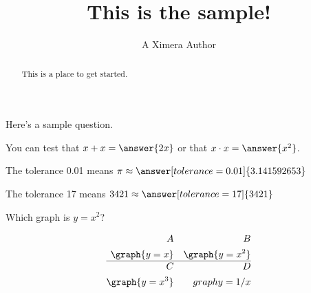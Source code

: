 \documentclass{ximera}
\begin{document}
\title{This is the sample!}
\author{A Ximera Author}
\begin{abstract}
  This is a place to get started.
\end{abstract}

\maketitle

Here's a sample question.

\begin{problem}
\begin{multipleChoice}
\end{multipleChoice}
\end{problem}

\begin{problem}
   You can test that $x + x = \answer{2x}$ or that $x \cdot x = \answer{x^2}$.
\end{problem}

\begin{problem}
   The tolerance 0.01 means $\pi \approx \answer[tolerance=0.01]{3.141592653}$
\end{problem}

\begin{problem}
   The tolerance 17 means $3421 \approx \answer[tolerance=17]{3421}$
\end{problem}

\begin{problem}
    Which graph is $y=x^2$?

\begin{align}
A && B \\
\graph{y=x} &&\graph{y=x^2} \\ \hline
C &&D \\
\graph{y=x^3} &&graph{y=1/x} \\
\end{align}

\begin{multipleChoice}
\end{multipleChoice}
\end{problem}
\end{document}
